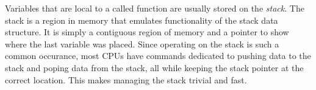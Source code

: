\documentclass[twocolumn]{article}
\begin{document}
Variables that are local to a called function are usually stored on the \textit{stack}.
The stack is a region in memory that emulates functionality of the stack data structure.
It is simply a contiguous region of memory and a pointer to show where the last variable
was placed. Since operating on the stack is such a common occurance, most CPUs have commands
dedicated to pushing data to the stack and poping data from the stack, all while keeping the
stack pointer at the correct location. This makes managing the stack trivial and fast.





\end{document}
